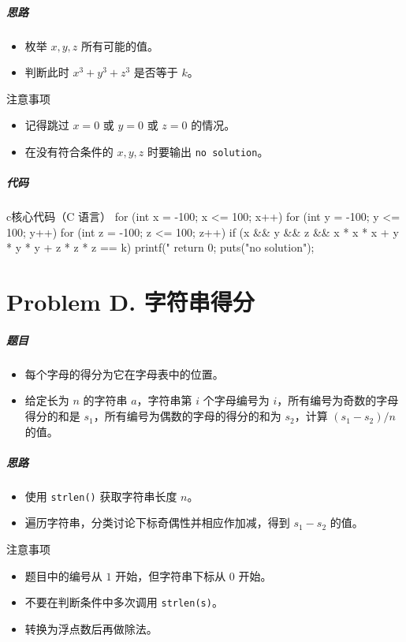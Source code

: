 \documentclass[
     aspectratio=169,                   %
]{beamer}
\begin{document}
\begin{frame}
	\frametitle{思路}
	\begin{itemize}
		\item 枚举 $x,y,z$ 所有可能的值。
		\item 判断此时 $x^3+y^3+z^3$ 是否等于 $k$。
	\end{itemize}
	\begin{alertblock}{注意事项}
		\begin{itemize}
			\item 记得跳过 $x=0$ 或 $y=0$ 或 $z=0$ 的情况。
			\item 在没有符合条件的 $x,y,z$ 时要输出 \lstinline|no solution|。
		\end{itemize}
	\end{alertblock}
\end{frame}

\begin{frame}[fragile]
	\frametitle{代码}
	\begin{codeblock}{c}{核心代码（C 语言）}
for (int x = -100; x <= 100; x++) {
    for (int y = -100; y <= 100; y++) {
        for (int z = -100; z <= 100; z++) {
            if (x && y && z && x * x * x + y * y * y + z * z * z == k) {
                printf("%
                return 0;
            }
        }
    }
}
puts("no solution");
\end{codeblock}
\end{frame}


\part{Problem D. 字符串得分}
\begin{frame}
	\frametitle{题目}
	\begin{itemize}
		\item 每个字母的得分为它在字母表中的位置。
		\item 给定长为 $n$ 的字符串 $a$，字符串第 $i$ 个字母编号为 $i$，所有编号为奇数的字母得分的和是 $s_1$，所有编号为偶数的字母的得分的和为 $s_2$，计算 $(s_1-s_2)/n$ 的值。
	\end{itemize}
\end{frame}

\begin{frame}
	\frametitle{思路}
	\begin{itemize}
		\item 使用 \lstinline|strlen()| 获取字符串长度 $n$。
		\item 遍历字符串，分类讨论下标奇偶性并相应作加减，得到 $s_1-s_2$ 的值。
	\end{itemize}
	\begin{alertblock}{注意事项}
		\begin{itemize}
			\item 题目中的编号从 $1$ 开始，但字符串下标从 $0$ 开始。
			\item 不要在判断条件中多次调用 \lstinline|strlen(s)|。
			\item 转换为浮点数后再做除法。
		\end{itemize}
	\end{alertblock}
\end{frame}
\end{document}
